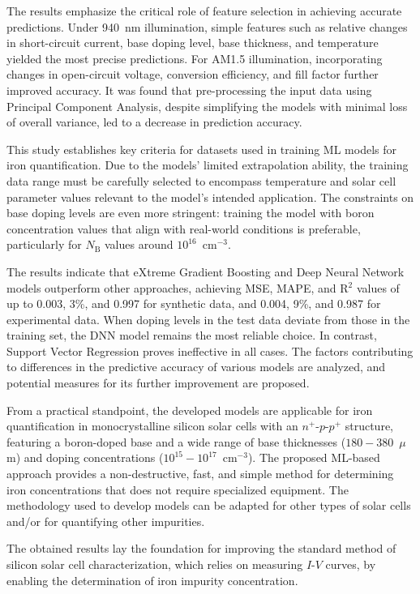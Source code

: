\documentclass[a4paper,fleqn]{cas-sc}
\begin{document}
The results emphasize the critical role of feature selection in achieving accurate predictions.
Under 940~nm illumination, simple features such as relative changes in short-circuit current,
base doping level, base thickness, and temperature yielded the most precise predictions.
For AM1.5 illumination, incorporating changes in open-circuit voltage, conversion efficiency, and fill factor further improved accuracy.
It was found that pre-processing the input data using Principal Component Analysis, despite simplifying the models with minimal loss of overall variance,
led to a decrease in prediction accuracy.


This study establishes key criteria for datasets used in training ML models for iron quantification.
Due to the models' limited extrapolation ability, the training data range must be carefully selected
to encompass temperature and solar cell parameter values relevant to the model’s intended application.
The constraints on base doping levels are even more stringent:
training the model with boron concentration values that align with real-world conditions is preferable, particularly for $N_\mathrm{B}$ values
around $10^{16}$~cm$^{-3}$.


The results indicate that eXtreme Gradient Boosting and Deep Neural Network models outperform other approaches,
achieving MSE, MAPE, and R$^2$ values of up to 0.003, 3\%, and 0.997 for synthetic data,
and 0.004, 9\%, and 0.987 for experimental data.
When doping levels in the test data deviate from those in the training set,
the DNN model remains the most reliable choice.
In contrast, Support Vector Regression proves ineffective in all cases.
The factors contributing to differences in the predictive accuracy of various models are analyzed, and potential measures for its further improvement are proposed.

From a practical standpoint, the developed models are applicable for iron quantification
in monocrystalline silicon solar cells with an $n^+$-$p$-$p^+$ structure,
featuring a boron-doped base and a wide range of base thicknesses ($180-380$~$\mu$m)
and doping concentrations ($10^{15}-10^{17}$~cm$^{-3}$).
The proposed ML-based approach provides a non-destructive, fast, and simple method
for determining iron concentrations that does not require specialized equipment.
The methodology used to develop models can be adapted for other types of solar cells
and/or for quantifying other impurities.

The obtained results lay the foundation for improving the standard method of silicon solar cell characterization,
which relies on measuring $I$-$V$ curves,
by enabling the determination of iron impurity concentration.
\end{document}
